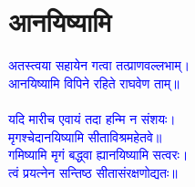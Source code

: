 \section[आनयिष्यामि]{आनयिष्यामि}
\centering\textcolor{blue}{अतस्त्वया सहायेन गत्वा तत्प्राणवल्लभाम्।\nopagebreak\\
आनयिष्यामि विपिने रहिते राघवेण ताम्॥}\nopagebreak\\
\\
\centering\textcolor{blue}{यदि मारीच एवायं तदा हन्मि न संशयः।\nopagebreak\\
मृगश्चेदानयिष्यामि सीताविश्रमहेतवे॥\\
गमिष्यामि मृगं बद्ध्वा ह्यानयिष्यामि सत्वरः।\nopagebreak\\
त्वं प्रयत्नेन सन्तिष्ठ सीतासंरक्षणोद्यतः॥}\nopagebreak\\
\\

